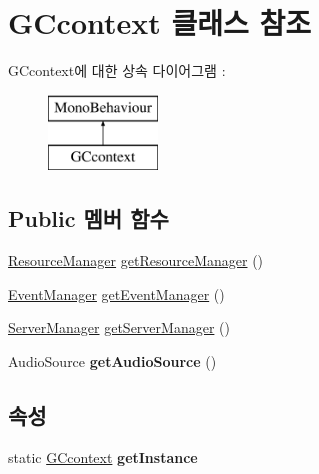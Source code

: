 \hypertarget{class_g_ccontext}{}\section{G\+Ccontext 클래스 참조}
\label{class_g_ccontext}
G\+Ccontext에 대한 상속 다이어그램 \+: \begin{figure}[H]
\begin{center}
\leavevmode
\includegraphics[height=2.000000cm]{class_g_ccontext}
\end{center}
\end{figure}
\subsection*{Public 멤버 함수}
\begin{DoxyCompactItemize}
\item 
\hyperlink{class_resource_manager}{Resource\+Manager} \hyperlink{class_g_ccontext_a8faae05bab2254adf4ed0c091cc88ff2}{get\+Resource\+Manager} ()
\item 
\hyperlink{class_event_manager}{Event\+Manager} \hyperlink{class_g_ccontext_a3b586d61483084e4b7d4324c51d181dc}{get\+Event\+Manager} ()
\item 
\hyperlink{class_server_manager}{Server\+Manager} \hyperlink{class_g_ccontext_a39df81d5fc14d811c4ed1feea442b41f}{get\+Server\+Manager} ()
\item 
\hypertarget{class_g_ccontext_a2406c627cc259d1ae29b207f92198458}{}Audio\+Source {\bfseries get\+Audio\+Source} ()\label{class_g_ccontext_a2406c627cc259d1ae29b207f92198458}

\end{DoxyCompactItemize}
\subsection*{속성}
\begin{DoxyCompactItemize}
\item 
\hypertarget{class_g_ccontext_a25d2687d8a725fe1b29ac73081afedf4}{}static \hyperlink{class_g_ccontext}{G\+Ccontext} {\bfseries get\+Instance}\label{class_g_ccontext_a25d2687d8a725fe1b29ac73081afedf4}

\end{DoxyCompactItemize}


